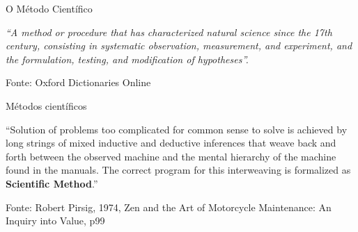 \documentclass{beamer}
\begin{document}

\begin{frame}{O Método Científico}
  \begin{block}{}
    {\em ``A method or procedure that has characterized natural science since the 17th century, consisting in systematic observation, measurement, and experiment, and the formulation, testing, and modification of hypotheses''.}
  \end{block}

  \vfill
  \footnotesize
  \hfill Fonte: Oxford Dictionaries Online
\end{frame}

\begin{frame}{Métodos científicos}
  \begin{block}{}
    ``Solution of problems too complicated for common sense to solve
    is achieved by long strings of mixed \alert{inductive} and
    \alert{deductive} inferences that weave back and forth between the
    observed machine and the mental hierarchy of the machine found in
    the manuals. The correct program for this interweaving is
    formalized as {\bf Scientific Method}.''
  \end{block}

  \vfill
  \footnotesize
  \hfill Fonte: Robert Pirsig, 1974, Zen and the Art of Motorcycle
  Maintenance: An Inquiry into Value, p99
\end{frame}

\end{document}
